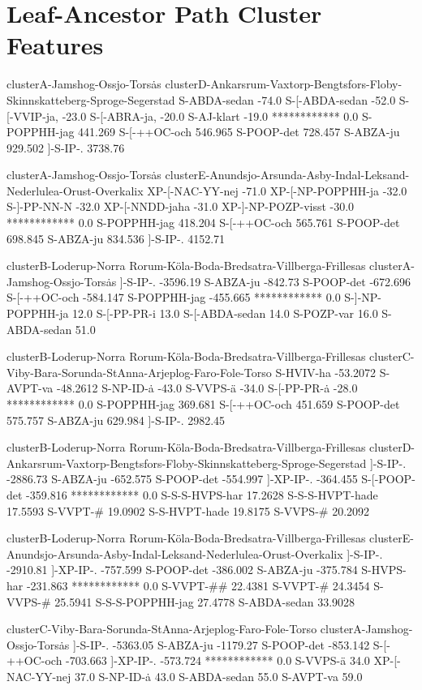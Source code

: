 \section{Leaf-Ancestor Path Cluster Features}
clusterA-Jamshog-Ossjo-Tors\.as
clusterD-Ankarsrum-Vaxtorp-Bengtsfors-Floby-Skinnskatteberg-Sproge-Segerstad
S-ABDA-sedan -74.0
S-[-ABDA-sedan -52.0
S-[-VVIP-ja, -23.0
S-[-ABRA-ja, -20.0
S-AJ-klart -19.0
************ 0.0
S-POPPHH-jag 441.269
S-[-++OC-och 546.965
S-POOP-det 728.457
S-ABZA-ju 929.502
]-S-IP-. 3738.76

clusterA-Jamshog-Ossjo-Tors\.as
clusterE-Anundsjo-Arsunda-Asby-Indal-Leksand-Nederlulea-Orust-Overkalix
XP-[-NAC-YY-nej -71.0
XP-[-NP-POPPHH-ja -32.0
S-]-PP-NN-N -32.0
XP-[-NNDD-jaha -31.0
XP-]-NP-POZP-visst -30.0
************ 0.0
S-POPPHH-jag 418.204
S-[-++OC-och 565.761
S-POOP-det 698.845
S-ABZA-ju 834.536
]-S-IP-. 4152.71

clusterB-Loderup-Norra Rorum-K\"ola-Boda-Bredsatra-Villberga-Frillesas
clusterA-Jamshog-Ossjo-Tors\.as
]-S-IP-. -3596.19
S-ABZA-ju -842.73
S-POOP-det -672.696
S-[-++OC-och -584.147
S-POPPHH-jag -455.665
************ 0.0
S-]-NP-POPPHH-ja 12.0
S-[-PP-PR-i 13.0
S-[-ABDA-sedan 14.0
S-POZP-var 16.0
S-ABDA-sedan 51.0

clusterB-Loderup-Norra Rorum-K\"ola-Boda-Bredsatra-Villberga-Frillesas
clusterC-Viby-Bara-Sorunda-StAnna-Arjeplog-Faro-Fole-Torso
S-HVIV-ha -53.2072
S-AVPT-va -48.2612
S-NP-ID-\.a -43.0
S-VVPS-\"a -34.0
S-[-PP-PR-\.a -28.0
************ 0.0
S-POPPHH-jag 369.681
S-[-++OC-och 451.659
S-POOP-det 575.757
S-ABZA-ju 629.984
]-S-IP-. 2982.45

clusterB-Loderup-Norra Rorum-K\"ola-Boda-Bredsatra-Villberga-Frillesas
clusterD-Ankarsrum-Vaxtorp-Bengtsfors-Floby-Skinnskatteberg-Sproge-Segerstad
]-S-IP-. -2886.73
S-ABZA-ju -652.575
S-POOP-det -554.997
]-XP-IP-. -364.455
S-[-POOP-det -359.816
************ 0.0
S-S-S-HVPS-har 17.2628
S-S-S-HVPT-hade 17.5593
S-VVPT-\# 19.0902
S-S-HVPT-hade 19.8175
S-VVPS-\# 20.2092

clusterB-Loderup-Norra Rorum-K\"ola-Boda-Bredsatra-Villberga-Frillesas
clusterE-Anundsjo-Arsunda-Asby-Indal-Leksand-Nederlulea-Orust-Overkalix
]-S-IP-. -2910.81
]-XP-IP-. -757.599
S-POOP-det -386.002
S-ABZA-ju -375.784
S-HVPS-har -231.863
************ 0.0
S-VVPT-\#\# 22.4381
S-VVPT-\# 24.3454
S-VVPS-\# 25.5941
S-S-S-POPPHH-jag 27.4778
S-ABDA-sedan 33.9028

clusterC-Viby-Bara-Sorunda-StAnna-Arjeplog-Faro-Fole-Torso
clusterA-Jamshog-Ossjo-Tors\.as
]-S-IP-. -5363.05
S-ABZA-ju -1179.27
S-POOP-det -853.142
S-[-++OC-och -703.663
]-XP-IP-. -573.724
************ 0.0
S-VVPS-\"a 34.0
XP-[-NAC-YY-nej 37.0
S-NP-ID-\.a 43.0
S-ABDA-sedan 55.0
S-AVPT-va 59.0

